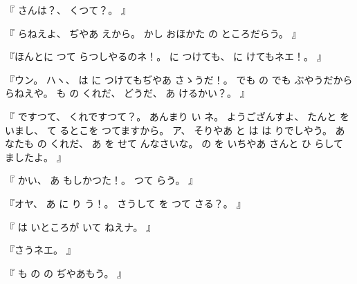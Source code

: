 %
『
さんは？、
%
くつて？。
』

%
『
らねえよ、
%
ぢやあ
えから。
%
かし
おほかた
の
ところだらう。
』

%
『ほんとに
つて
らつしやるのネ！。
%
に
つけても、
%
に
けてもネエ！。
』

%
『ウン。
%
ハヽ、
%
は
に
つけてもぢやあ
さゝうだ！。
%
でも
の
でも
ぶやうだから
らねえや。
%
も
の
くれだ、
%
%
どうだ、
%
あ
けるかい？。
』

%
『
ですつて、
%
くれですつて？。
%
あんまり
い
ネ。
%
ようござんすよ、
%
たんと
を
いまし、
%
て
るとこを
つてますから。
%
ア、
%
そりやあ
と
は
は
りでしやう。
%
あなたも
の
くれだ、
%
あ
を
せて
んなさいな。
%
の
を
いちやあ
さんと
ひ
らして
ましたよ。
』

%
『
かい、
%
あ
もしかつた！。
%
つて
らう。
』

%
『オヤ、
%
あ
に
り
う！。
%
さうして
を
つて
さる？。
』

%
『
は%
いところが
いて
ねえナ。
』

%
『さうネエ。
』

%
『
も
の
の
ぢやあもう。
』

